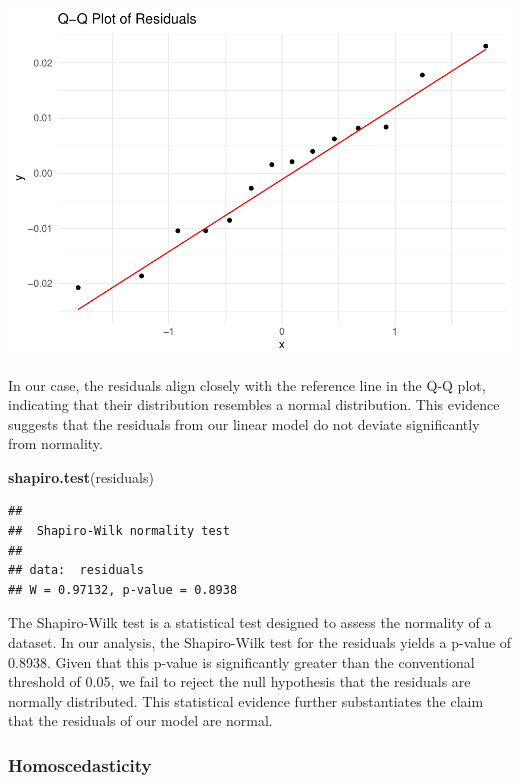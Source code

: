 \documentclass[
]{article}
\newenvironment{Shaded}{\begin{snugshade}}{\end{snugshade}}
\newcommand{\FunctionTok}[1]{\textcolor[rgb]{0.13,0.29,0.53}{\textbf{#1}}}
\newcommand{\NormalTok}[1]{#1}
\begin{document}
\includegraphics{602_project_files/figure-latex/unnamed-chunk-7-1.pdf}

In our case, the residuals align closely with the reference line in the
Q-Q plot, indicating that their distribution resembles a normal
distribution. This evidence suggests that the residuals from our linear
model do not deviate significantly from normality.

\begin{Shaded}
\begin{Highlighting}[]
\FunctionTok{shapiro.test}\NormalTok{(residuals)}
\end{Highlighting}
\end{Shaded}

\begin{verbatim}
## 
##  Shapiro-Wilk normality test
## 
## data:  residuals
## W = 0.97132, p-value = 0.8938
\end{verbatim}

The Shapiro-Wilk test is a statistical test designed to assess the
normality of a dataset. In our analysis, the Shapiro-Wilk test for the
residuals yields a p-value of 0.8938. Given that this p-value is
significantly greater than the conventional threshold of 0.05, we fail
to reject the null hypothesis that the residuals are normally
distributed. This statistical evidence further substantiates the claim
that the residuals of our model are normal.

\hypertarget{homoscedasticity}{%
\subsubsection{Homoscedasticity}\label{homoscedasticity}}
\end{document}
